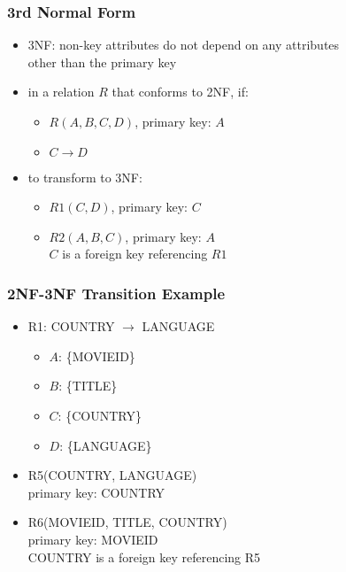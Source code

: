 \documentclass[dvipsnames]{beamer}
\begin{document}
\begin{frame}
  \frametitle{3rd Normal Form}

  \begin{itemize}
    \item \alert{3NF}: non-key attributes do not depend on any attributes\\
      other than the primary key

    \pause
    \medskip
    \item in a relation $R$ that conforms to 2NF, if:
    \begin{itemize}
      \item $R(A,B,C,D)$, primary key: $A$
      \item $C \rightarrow D$
    \end{itemize}

    \medskip
    \item to transform to 3NF:
    \begin{itemize}
      \item $R1(C,D)$, primary key: $C$
      \item $R2(A,B,C)$, primary key: $A$\\
        $C$ is a foreign key referencing $R1$
    \end{itemize}
  \end{itemize}
\end{frame}

\begin{frame}
  \frametitle{2NF-3NF Transition Example}

  \begin{itemize}
    \item R1: COUNTRY $\rightarrow$ LANGUAGE
    \begin{itemize}
      \item $A$: \{MOVIEID\}
      \item $B$: \{TITLE\}
      \item $C$: \{COUNTRY\}
      \item $D$: \{LANGUAGE\}
    \end{itemize}

    \pause
    \medskip
    \item R5(COUNTRY, LANGUAGE)\\
      primary key: COUNTRY

    \item R6(MOVIEID, TITLE, COUNTRY)\\
      primary key: MOVIEID\\
      COUNTRY is a foreign key referencing R5
  \end{itemize}
\end{frame}
\end{document}
